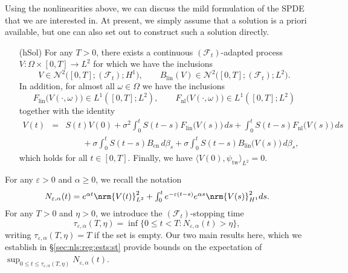 \documentclass[10pt]{articleHJ}
\renewcommand{\b}{\ensuremath{\beta}}
\newcommand{\e}{\ensuremath{\varepsilon}}
\renewcommand{\a}{\ensuremath{\alpha}}
\DeclarePairedDelimiter{\nrm}\lVert\rVert
\numberwithin{equation}{section}
\begin{document}
Using the nonlinearities above,
we can discuss the mild formulation
of the SPDE that we are interested in.
At present, we simply assume that a solution is a priori
available, but one can also set out to construct
such a solution directly.
\begin{itemize}
\item[(hSol)]
For any $T > 0$,
there exists a continuous $(\mathcal{F}_t)$-adapted process $V: \Omega \times [0, T] \to L^2$
for which we have the inclusions
\begin{equation}
V \in \mathcal{N}^2\big([0,T]; (\mathcal{F}_t) ; H^1\big),
\qquad
B_{\mathrm{lin}}(V) \in \mathcal{N}^2\big([0,T]; (\mathcal{F}_t) ; L^2\big).
\end{equation}
In addition, for almost all $\omega \in \Omega$
we have the inclusions
\begin{equation}
F_{\mathrm{lin}}\big(V(\cdot, \omega)\big) \in L^1([0,T];L^2),
\qquad
F_{\mathrm{nl}}\big(V(\cdot, \omega)\big) \in L^1([0,T];L^2)
\end{equation}
together with the identity
\begin{equation}
\label{eq:nls:hsol:id:for:v}
\begin{array}{lcl}
V(t) & = &S(t)V(0)+\sigma^2 \int_0^t S(t-s) F_{\mathrm{lin}}\big(V(s)\big) \, ds
                + \int_0^t S(t-s) F_{\mathrm{nl}}\big(V(s)\big) \, ds
\\[0.2cm]
& & \qquad
+\sigma \int_0^t S(t-s)B_{\mathrm{cn}} \, d\b_s
+ \sigma \int_0^t S(t-s)B_{\mathrm{lin}}\big(V(s)\big) \, d\b_s ,
\end{array}
\end{equation}
which holds for all $t \in [0, T]$.
Finally, we have $\langle V(0), \psi_{\mathrm{tw}} \rangle_{L^2} = 0$.
\end{itemize}




For any $\e > 0$
and $\alpha \ge 0$,
we recall the notation
\begin{equation}
\label{eq:nls:recdefN}
\begin{array}{lcl}
 N_{\e,\a}(t)=
 e^{\a t}\nrm{V(t)}_{L^2}^2
 +\int_0^te^{-\e(t-s)}e^{\a s}\nrm{V(s)}^2_{H^1}ds.
\end{array}
\end{equation}
For any $T > 0$ and $\eta > 0$,
we introduce the
$(\mathcal{F}_t)$-stopping time
\begin{equation}
\tau_{\e,\alpha}(T,\eta)
 = \inf\Big\{0 \leq t < T:
     N_{\e,\a}(t)
     > \eta
  \Big\} ,
\end{equation}
writing $\tau_{\e,\alpha}(T,\eta) = T$
if the set is empty.
Our two main results here, which we establish
in \S\ref{sec:nls:reg:ests:st}
provide %
bounds
on the expectation of $\sup_{0\leq t\leq \tau_{\e,\a}(T,\eta)}N_{\e,\alpha}(t)$.
\end{document}
